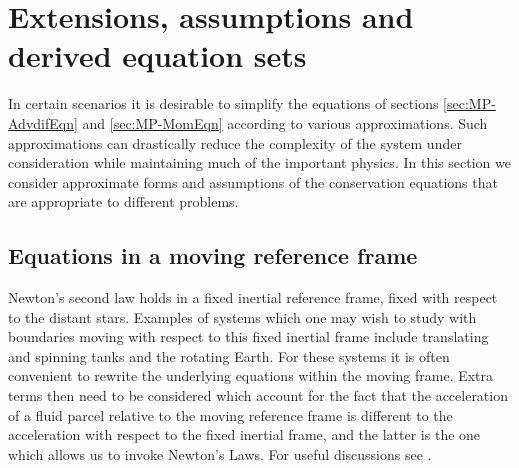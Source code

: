 \section{Extensions, assumptions and derived equation sets}\label{sec:eqn_extensions}

In certain scenarios it is desirable to simplify the equations of sections \ref{sec:MP-AdvdifEqn} and \ref {sec:MP-MomEqn} according to various approximations. Such approximations can drastically reduce the complexity of the system under consideration while maintaining much of the important physics. In this section we consider approximate forms and assumptions of the conservation equations that are appropriate to different problems. 

\subsection{Equations in a moving reference frame}\label{sec:coriolis}
Newton's second law holds in a fixed inertial reference frame, \ie
fixed with respect to the distant stars. 
Examples of systems which one may wish to study with boundaries moving
with respect to this fixed inertial frame include translating and spinning tanks
and the rotating Earth. For these systems it is often convenient to rewrite the 
underlying equations within the moving frame. Extra terms then need to be considered 
which account for the fact that the acceleration of a fluid parcel relative to the 
moving reference frame is different to the acceleration with respect to the fixed 
inertial frame, and the latter is the one which allows us to invoke Newton's Laws.
For useful discussions see \citep{batchelor1967,cushman1994,gill1982}.

